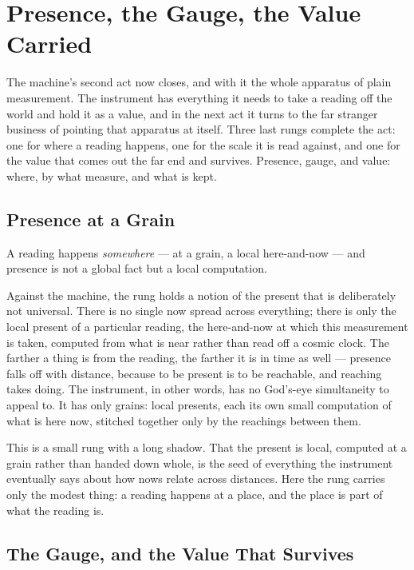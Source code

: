 \chapter{Presence, the Gauge, the Value Carried}

The machine's second act now closes, and with it the whole apparatus of plain measurement. The instrument has
everything it needs to take a reading off the world and hold it as a value, and in the next act it turns to the
far stranger business of pointing that apparatus at itself. Three last rungs complete the act: one for where a
reading happens, one for the scale it is read against, and one for the value that comes out the far end and
survives. Presence, gauge, and value: where, by what measure, and what is kept.

\section{Presence at a Grain}

A reading happens \emph{somewhere} --- at a grain, a local here-and-now --- and presence is not a global fact but
a local computation.

Against the machine, the rung holds a notion of the present that is deliberately not universal. There is no
single now spread across everything; there is only the local present of a particular reading, the here-and-now at
which this measurement is taken, computed from what is near rather than read off a cosmic clock. The farther a
thing is from the reading, the farther it is in time as well --- presence falls off with distance, because to be
present is to be reachable, and reaching takes doing. The instrument, in other words, has no God's-eye
simultaneity to appeal to. It has only grains: local presents, each its own small computation of what is here
now, stitched together only by the reachings between them.

This is a small rung with a long shadow. That the present is local, computed at a grain rather than handed down
whole, is the seed of everything the instrument eventually says about how nows relate across distances. Here the
rung carries only the modest thing: a reading happens at a place, and the place is part of what the reading is.

\section{The Gauge, and the Value That Survives}

